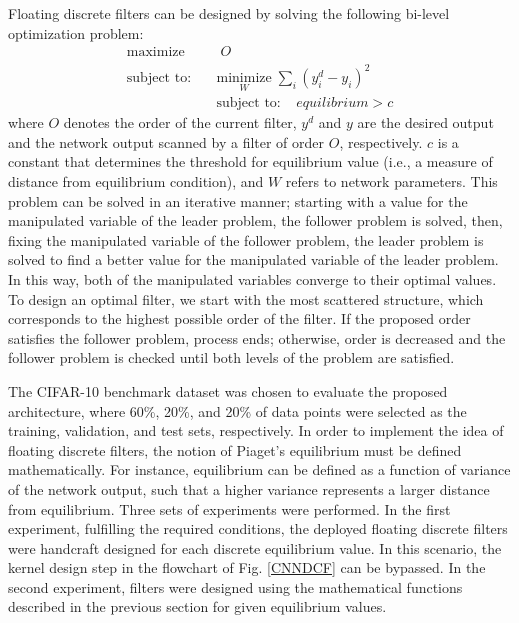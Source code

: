 \documentclass[journal]{IEEEtran}
\begin{document}
Floating discrete filters can be designed by solving the following bi-level optimization problem:
\begin{eqnarray}
%
\label{eq:bilevel} {\underset {}{\text{maximize}}} & & \;
O
\\
%
\text{subject to:}  &\:& {\underset {W}{\text{minimize}}}  \;
\sum_i (y_i^d -y_i)^2  \nonumber
 \\
%
&\:& \text{subject to:}   \; \; \; \; equilibrium > c \nonumber
%
\end{eqnarray}
where $O$ denotes the order of the current filter, $y^d$ and $y$ are the desired output and the network output scanned by a filter of order $O$, respectively. $c$ is a constant that determines the threshold for equilibrium value (i.e., a measure of distance from equilibrium condition), and $W$ refers to network parameters. This problem can be solved in an iterative manner; starting with a value for the manipulated variable of the leader problem, the follower problem is solved, then, fixing the manipulated variable of the follower problem, the leader problem is solved to find a better value for the manipulated variable of the leader problem. In this way, both of the manipulated variables converge to their optimal values. To design an optimal filter, we start with the most scattered structure, which corresponds to the highest possible order of the filter. If the proposed order satisfies the follower problem, process ends; otherwise, order is decreased and the follower problem is checked until both levels of the problem are satisfied.

The CIFAR-10 benchmark dataset was chosen to evaluate the proposed architecture, where 60\%, 20\%, and 20\% of data points were selected as the training, validation, and test sets, respectively. In order to implement the idea of floating discrete filters, the notion of Piaget's equilibrium must be defined mathematically. For instance, equilibrium can be defined as a function of variance of the network output, such that a higher variance represents a larger distance from equilibrium. Three sets of experiments were performed. In the first experiment, fulfilling the required conditions, the deployed floating discrete filters were handcraft designed for each discrete equilibrium value. In this scenario, the kernel design step in the flowchart of Fig. \ref{CNNDCF} can be bypassed. In the second experiment, filters were designed using the mathematical functions described in the previous section for given equilibrium values.
\end{document}
